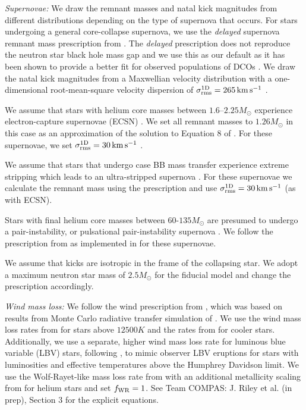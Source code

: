 \textit{Supernovae:} We draw the remnant masses and natal kick magnitudes from different distributions depending on the type of supernova that occurs. For stars undergoing a general core-collapse supernova, we use the \textit{delayed} supernova remnant mass prescription from \citet{Fryer+2012}. The \textit{delayed} prescription does not reproduce the neutron star black hole mass gap and we use this as our default as it has been shown to provide a better fit for observed populations of DCOs \citep[e.g.][]{Vigna-Gomez+2018}. We draw the natal kick magnitudes from a Maxwellian velocity distribution with a one-dimensional root-mean-square velocity dispersion of $\sigma_{\rm rms}^{\rm 1D} = 265 \unit{km}{s^{-1}}$ \citep{Lyne+1994, Hobbs+2005}.

We assume that stars with helium core masses between $1.6$--$2.25 \unit{M_{\odot}}$ \citep{Hurley+2002} experience electron-capture supernovae (ECSN) \citep{Nomoto+1984, Nomoto+1987, Ivanova+2008}. We set all remnant masses to $1.26 \unit{M_{\odot}}$ in this case as an approximation of the solution to Equation 8 of \citet{Timmes+1996}. For these supernovae, we set $\sigma_{\rm rms}^{\rm 1D} = 30 \unit{km}{s^{-1}}$ \citep[e.g.][]{Pfahl+2002, Podsiadlowski+2004}.

We assume that stars that undergo case BB mass transfer \citep{Dewi+2002} experience extreme stripping which leads to an ultra-stripped supernova \citep{Tauris+2013, Tauris+2015}. For these supernovae we calculate the remnant mass using the \citet{Fryer+2012} prescription and use $\sigma_{\rm rms}^{\rm 1D} = 30 \unit{km}{s^{-1}}$ (as with ECSN).

Stars with final helium core masses between $60$-$135 \unit{M_{\odot}}$ are presumed to undergo a pair-instability, or pulsational pair-instability supernova \citep[e.g.][]{Woosley+2007, Farmer+2019}. We follow the prescription from \citet{Marchant+2019} as implemented in \citep{Stevenson+2019} for these supernovae.

We assume that kicks are isotropic in the frame of the collapsing star. We adopt a maximum neutron star mass of $2.5 \unit{M_{\odot}}$ \citep[e.g.][]{Kalogera+1996, Fryer+2015, Margalit+2017} for the fiducial model and change the \citet{Fryer+2012} prescription accordingly.

\textit{Wind mass loss:} We follow the wind prescription from \citet{Belczynski+2008}, which was based on results from Monte Carlo radiative transfer simulation of \citet{Vink+2000, Vink+2001}. We use the wind mass loss rates from \citet{Vink+2001} for stars above $12500 \unit{K}$ and the rates from \citet{Hurley+2000} for cooler stars. Additionally, we use a separate, higher wind mass loss rate for luminous blue variable (LBV) stars, following \citet{Belczynski+2008}, to mimic observer LBV eruptions for stars with luminosities and  effective temperatures above the Humphrey Davidson limit. We use the Wolf-Rayet-like mass loss rate from \citet{Hamann+1998} with an additional metallicity scaling from \citet{Vink+2005} for helium stars and set $f_{\rm WR} = 1$. See Team COMPAS: J. Riley et al. (in prep), Section 3 for the explicit equations.


